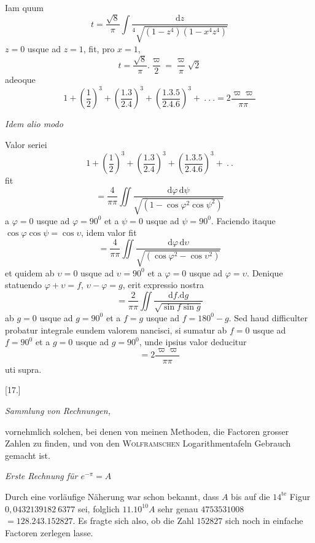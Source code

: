 
Iam quum
\[
t=\frac{\surd 8}{\pi}\int\frac{\mathrm dz}{{}^{4}\!\surd{(1-z^4)(1-x^4z^4)}}
\]
$z=0$ usque ad $z=1$, fit, pro $x=1$,
\[
t=\frac{\surd 8}{\pi}.\frac{\varpi}{2}=\frac{\varpi}{\pi}\surd 2
\]
adeoque
\[
1+\left(\frac12\right)^3+\left(\frac{1.3}{2.4}\right)^3+
\left(\frac{1.3.5}{2.4.6}\right)^3+\ .\ .\ .=2\frac{\varpi\varpi}{\pi\pi}
\]
\begin{center}\textit{Idem alio modo}\end{center}
Valor seriei
\[
1+\left(\frac12\right)^3+\left(\frac{1.3}{2.4}\right)^3+
\left(\frac{1.3.5}{2.4.6}\right)^3+\ .\ .
\]
fit
\[
=\frac4{\pi\pi}\iint\frac{\mathrm d\varphi\,\mathrm d\psi}{\surd {(1-\cos\varphi^2\cos\psi^2)}}
\]
a $\varphi=0$ usque ad $\varphi=90^0$ et a $\psi=0$ usque ad $\psi=90^0$.
Faciendo itaque $\cos\varphi\cos\psi=\cos\upsilon$, idem valor fit
\[
=\frac4{\pi\pi}\iint\frac{\mathrm d\varphi\,\mathrm d\upsilon}{\surd {(\cos\varphi^2-\cos\upsilon^2)}}
\]
et quidem ab $\upsilon=0$ usque ad $\upsilon=90^0$ et a $\varphi=0$ usque ad $\varphi=\upsilon$.
Denique statuendo $\varphi+\upsilon=f$, $\upsilon-\varphi=g$, erit expressio nostra
\[
=\frac2{\pi\pi}\iint\frac{\mathrm df.\mathrm dg}{\surd {\sin f\sin g}}
\]
ab $g=0$ usque ad $g=90^0$ et a $f=g$ usque ad $f=180^0-g$.
Sed haud difficulter probatur integrale eundem valorem nancisci, si sumatur
ab $f=0$ usque ad $f=90^0$ et a $g=0$ usque ad $g=90^0$, unde ipsius valor deducitur
\[
=2\frac{\varpi\varpi}{\pi\pi}
\]
uti supra.


\par\medskip{}\centerline{[17.]}

\begin{center}\textit{Sammlung von Rechnungen,}\end{center}
vornehmlich solchen, bei denen von meinen Methoden, die Factoren grosser
Zahlen zu finden, und von den \textsc{Wolframschen} Logarithmentafeln Gebrauch gemacht
ist.

\begin{center}\textit{Erste Rechnung für $e^{-\pi}=A$}\end{center}

Durch eine vorläufige Näherung war schon bekannt, dass $A$ bis auf die
$14^{\mathrm{te}}$ Figur $0,0432139182\ 6377$ sei, folglich $11.10^{10}A$ sehr genau $4753531008$
$=128.243.152827$. Es fragte sich also, ob die Zahl $152827$ sich noch in einfache
Factoren zerlegen lasse.

